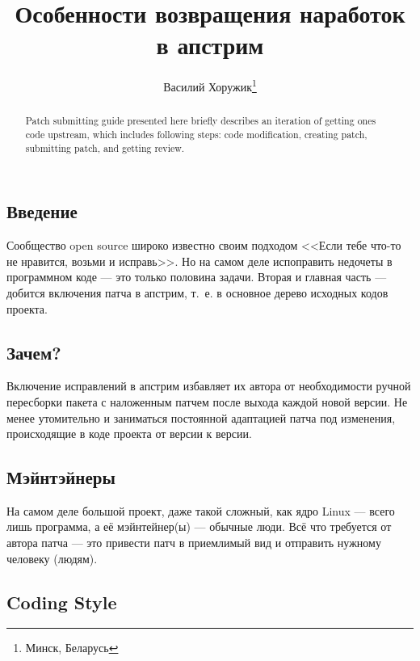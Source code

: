 \documentclass[10pt, a5paper]{article}
\begin{document}
\title{Особенности возвращения наработок в апстрим}%

\author{Василий Хоружик\footnote{Минск, Беларусь}}
\maketitle

\begin{abstract}
Patch submitting guide presented here briefly describes an iteration of getting ones code upstream, which includes following steps: code modification, creating patch, submitting patch, and getting review.
\end{abstract}

\subsection*{Введение}

Сообщество open source широко известно своим подходом <<Если тебе что-то не нравится, возьми и исправь>>. Но на самом деле испоправить недочеты в программном коде --- это только половина задачи. Вторая и главная часть --- добится включения патча в апстрим, т.~е. в основное дерево исходных кодов проекта.

\subsection*{Зачем?}

Включение исправлений в апстрим избавляет их автора от необходимости ручной пересборки пакета с наложенным патчем после выхода каждой новой версии. Не менее утомительно и заниматься постоянной адаптацией патча под изменения, происходящие в коде проекта от версии к версии.

\subsection*{Мэйнтэйнеры}

На самом деле большой проект, даже такой сложный, как ядро Linux --- всего лишь программа, а её мэйнтейнер(ы) --- обычные люди. Всё что требуется от автора патча --- это привести патч в приемлимый вид и отправить нужному человеку (людям).

\subsection*{Coding Style}
\end{document}
